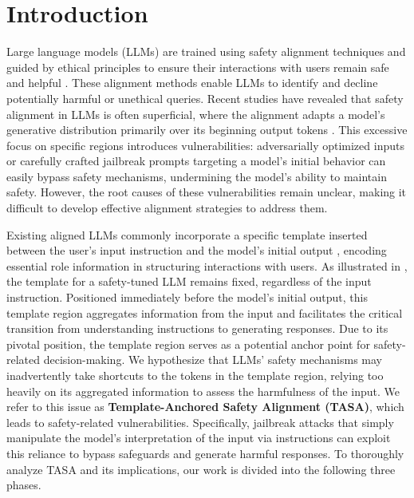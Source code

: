 \section{Introduction}




Large language models (LLMs) are trained using safety alignment techniques and guided by ethical principles to ensure their interactions with users remain safe and helpful \cite{bai2022training, dai2024safe, ji2024beavertails, bai2022constitutional}.
These alignment methods enable LLMs to identify and decline potentially harmful or unethical queries.
Recent studies \cite{zhang2024dissecting, lin2024unlocking, li2024superficial} have revealed that safety alignment in LLMs is often superficial, where the alignment adapts a model's generative distribution primarily over its beginning output tokens \cite{qi2024safety}.
This excessive focus on specific regions introduces vulnerabilities: adversarially optimized inputs \cite{zou2023universal, chao2023jailbreaking, liao2024amplegcg} or carefully crafted jailbreak prompts \cite{wei2023jailbroken, shen2024anything} targeting a model's initial behavior can easily bypass safety mechanisms, undermining the model's ability to maintain safety. 
However, the root causes of these vulnerabilities remain unclear, making it difficult to develop effective alignment strategies to address them.


Existing aligned LLMs commonly incorporate a specific template inserted between the user's input instruction and the model's initial output \cite{touvron2023llama,jiang2023mistral,team2024gemma}, encoding essential role information in structuring interactions with users.
As illustrated in , the template for a safety-tuned LLM remains fixed, regardless of the input instruction. 
Positioned immediately before the model's initial output, this template region aggregates information from the input and facilitates the critical transition from understanding instructions to generating responses. Due to its pivotal position, the template region serves as a potential anchor point for safety-related decision-making.
We hypothesize that LLMs' safety mechanisms may inadvertently take shortcuts to the tokens in the template region, relying too heavily on its aggregated information to assess the harmfulness of the input. We refer to this issue as \textbf{Template-Anchored Safety Alignment (TASA)}, which leads to safety-related vulnerabilities. Specifically, jailbreak attacks that simply manipulate the model's interpretation of the input via instructions can exploit this reliance to bypass safeguards and generate harmful responses.
To thoroughly analyze TASA and its implications, our work is divided into the following three phases.





